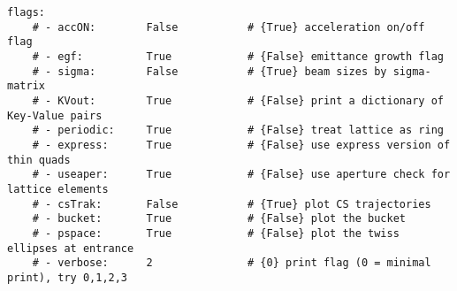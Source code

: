 \documentclass[10pt]{article}
\begin{document}
\begin{verbatim}
flags:
    # - accON:        False           # {True} acceleration on/off flag
    # - egf:          True            # {False} emittance growth flag
    # - sigma:        False           # {True} beam sizes by sigma-matrix
    # - KVout:        True            # {False} print a dictionary of Key-Value pairs
    # - periodic:     True            # {False} treat lattice as ring
    # - express:      True            # {False} use express version of thin quads
    # - useaper:      True            # {False} use aperture check for lattice elements
    # - csTrak:       False           # {True} plot CS trajectories
    # - bucket:       True            # {False} plot the bucket
    # - pspace:       True            # {False} plot the twiss ellipses at entrance
    # - verbose:      2               # {0} print flag (0 = minimal print), try 0,1,2,3
\end{verbatim}
\end{document}

